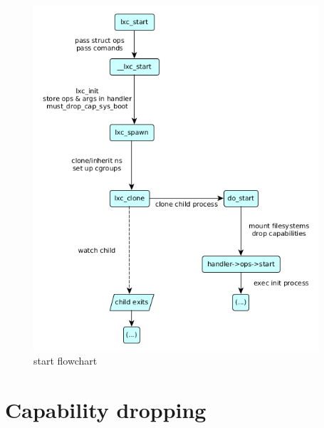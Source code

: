 \begin{figure}[htb]
\begin{center}
  \includegraphics[width=300pt]{fig/figure_1.png}
  \caption{start flowchart}
  \label{figure_1}
\end{center}
\end{figure}

\section{Capability dropping}\label{caps}


